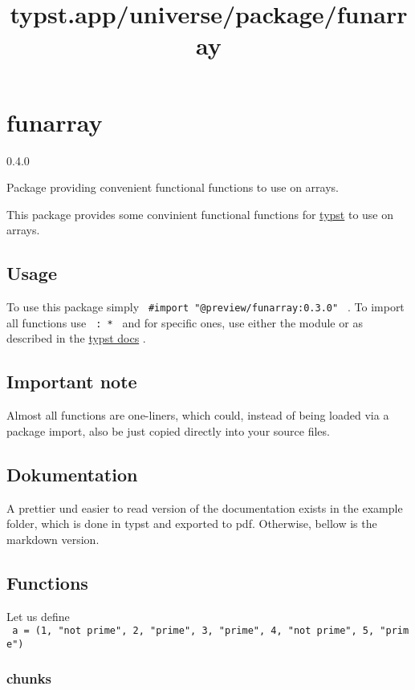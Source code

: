 \title{typst.app/universe/package/funarray}

\label{banner}
\section{funarray}\label{funarray}

{ 0.4.0 }

Package providing convenient functional functions to use on arrays.

\label{readme}
This package provides some convinient functional functions for
\href{https://typst.app/}{typst} to use on arrays.

\subsection{Usage}\label{usage}

To use this package simply
\texttt{\ \#import\ "@preview/funarray:0.3.0"\ } . To import all
functions use \texttt{\ :\ *\ } and for specific ones, use either the
module or as described in the
\href{https://typst.app/docs/reference/scripting\#modules}{typst docs} .

\subsection{Important note}\label{important-note}

Almost all functions are one-liners, which could, instead of being
loaded via a package import, also be just copied directly into your
source files.

\subsection{Dokumentation}\label{dokumentation}

A prettier und easier to read version of the documentation exists in the
example folder, which is done in typst and exported to pdf. Otherwise,
bellow is the markdown version.

\subsection{Functions}\label{functions}

Let us define
\texttt{\ a\ =\ (1,\ "not\ prime",\ 2,\ "prime",\ 3,\ "prime",\ 4,\ "not\ prime",\ 5,\ "prime")\ }

\subsubsection{chunks}\label{chunks}

